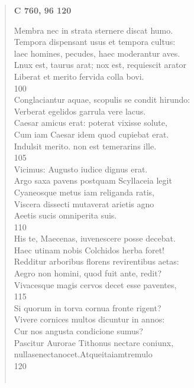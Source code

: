 \documentclass[11pt, a4paper]{report}
\begin{document}
\begin{verse}
    \begin{center} \textbf{C 760, 96 120} \end{center} \marginpar{[240]} Membra nec in strata sternere discat humo. \\ Tempora dispensant usus et tempora cultus: \\ laec homines, pecudes, haec moderantur aves. \\ Lnux est, taurus arat; nox est, requiescit arator \\ Liberat et merito fervida colla bovi. \\ 100 \\ Conglaciantur aquae, scopulis se condit hirundo: \\ Verberat egelidos garrula vere lacus. \\ Caesar amicus erat: poterat vixisse solute, \\ Cum iam Caesar idem quod cupiebat erat. \\ Indulsit merito. non est temerarins ille. \\ 105 \\ Vicimus: Augusto iudice dignus erat. \\ Argo saxa pavens postquam Scyllaceia legit \\ Cyaneosque metus iam religanda ratis, \\ Viscera dissecti mutaverat arietis agno \\ Aeetis sucis omniperita suis. \\ 110 \\ His te, Maecenas, iuvenescere posse decebat. \\ Haec utinam nobis Colchidos herba foret! \\ Redditur arboribus florens revirentibus aetas: \\ Aegro non homini, quod fuit ante, redit? \\ Vivacesque magis cervos decet esse paventes, \\ 115 \\ Si quorum in torva cornua fronte rigent? \\ Vivere cornices multos dicuntur in annos: \\ Cur nos angusta condicione sumus? \\ Pascitur Aurorae Tithonus nectare coniunx, \\ nullasenectanocet.Atqueitaiamtremulo \\ 120 \\ 
        ﻿\pagebreak 

\end{verse}
\end{document}
